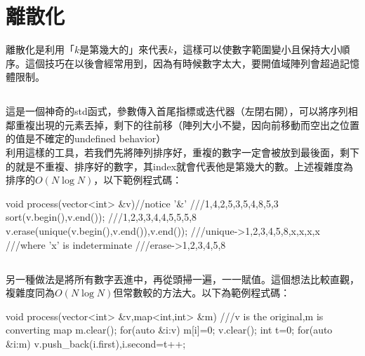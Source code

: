 \documentclass[main.tex]{subfiles}
\begin{document}
\section{離散化}
離散化是利用「$k$是第幾大的」來代表$k$，這樣可以使數字範圍變小且保持大小順序。這個技巧在以後會經常用到，因為有時候數字太大，要開值域陣列會超過記憶體限制。
\subsection{}
這是一個神奇的std函式，參數傳入首尾指標或迭代器（左閉右開），可以將序列相鄰重複出現的元素丟掉，剩下的往前移（陣列大小不變，因向前移動而空出之位置的值是不確定的undefined behavior）\\
利用這樣的工具，若我們先將陣列排序好，重複的數字一定會被放到最後面，剩下的就是不重複、排序好的數字，其index就會代表他是第幾大的數。上述複雜度為排序的$O(N\log N)$，以下範例程式碼：\\
\begin{C++}
void process(vector<int> &v){//notice '&'
    ///{1,4,2,5,3,5,4,8,5,3}
    sort(v.begin(),v.end());
    ///{1,2,3,3,4,4,5,5,5,8}
    v.erase(unique(v.begin(),v.end()),v.end());
    ///unique->{1,2,3,4,5,8,x,x,x,x}
    ///where 'x' is indeterminate
    ///erase->{1,2,3,4,5,8}
}
\end{C++}
\subsection{}
另一種做法是將所有數字丟進中，再從頭掃一遍，一一賦值。這個想法比較直觀，複雜度同為$O(N\log N)$但常數較的方法大。以下為範例程式碼：\\
\begin{C++}
void process(vector<int> &v,map<int,int> &m){
	  ///v is the original,m is converting map
    m.clear();
    for(auto &i:v) m[i]=0;
    v.clear();
    int t=0;
    for(auto &i:m) v.push_back(i.first),i.second=t++;
}
\end{C++}
\end{document}
